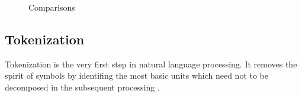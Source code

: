 \documentclass{sig-alternate-05-2015}
\begin{document}
\begin{figure}[t!]
{        \label{fig:fea_num}
    }
    \quad
    \quad
    \quad
    \quad
    \caption{Comparisons}
    \label{fig:all}
\end{figure}

\subsection{Tokenization}

Tokenization is the very first step in natural language processing. It removes the spirit of symbols by identifing the most basic units which need not to be decomposed in the subsequent processing \cite{webster1992tokenization}. 
\end{document}
